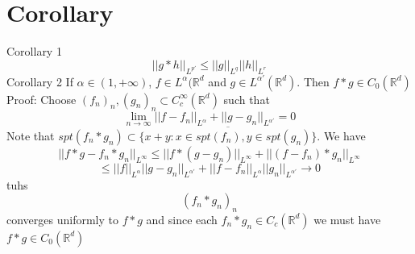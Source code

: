 \documentclass[11pt]{article}
\begin{document}
\section{Corollary} Corollary 1
\[
    ||g * h||_{L^{p'}} \le ||g||_{L^{q}}||h||_{L^{r}}
\] 
Corollary 2
If $\alpha \in (1,+\infty)$, $f \in L^{\alpha} ( \mathbb{R}^{d}$ and $g \in L^{\alpha'}( \mathbb{R}^{d})$.
Then $f * g \in C_0( \mathbb{R}^{d})$\\
Proof: Choose $(f_n)_n, (g_n)_n \subset C_c^{\infty}( \mathbb{R}^{d})$ such that
\[
    \lim_{n\to \infty}||f-f_n||_{L^{\alpha}} + ||g - g_n||_{L^{\alpha'}} = 0
\] 
Note that $spt(f_n * g_n) \subset \overline{\{x+y: x \in spt(f_n),y \in spt(g_n)\}}$.
We have %
\[
    ||f*g - f_n * g_n||_{L^{\infty}} \le ||f * (g - g_n)||_{L^{\infty}} + ||(f-f_n) * g_n||_{L^{\infty}}
\] 
\[
    \le ||f||_{L^{\alpha}}||g-g_n||_{L^{\alpha'}} + ||f-f_n||_{L^{\alpha}}||g_n||_{L^{\alpha'}} \to 0
\] 
tuhs
\[
    (f_n * g_n)_n
\] 
converges uniformly to $f * g$ and since each  $f_n * g_n \in C_c( \mathbb{R}^{d})$ we must have $f * g \in C_0( \mathbb{R}^{d})$
\end{document}
